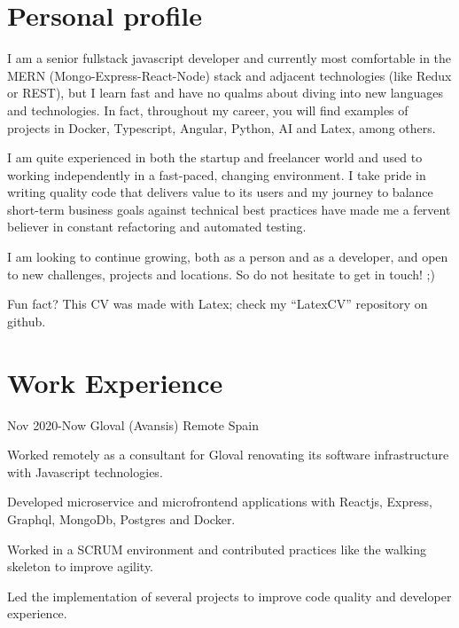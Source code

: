 \documentclass[10pt]{CurriculumVitae}
\begin{document}
  \makeheading

  \section{Personal profile}
    {
      I am a senior fullstack javascript developer and currently most comfortable in the MERN (Mongo-Express-React-Node) stack and adjacent technologies (like Redux or REST), but I learn fast and have no qualms about diving into new languages and technologies. In fact, throughout my career, you will find examples of projects in Docker, Typescript, Angular, Python, AI and Latex, among others.
      
      I am quite experienced in both the startup and freelancer world and used to working independently in a fast-paced, changing environment. I take pride in writing quality code that delivers value to its users and my journey to balance short-term business goals against technical best practices have made me a fervent believer in constant refactoring and automated testing.

      I am looking to continue growing, both as a person and as a developer, and open to new challenges, projects and locations. So do not hesitate to get in touch! ;) 
      
      \null\hfill {\scriptsize Fun fact? This CV was made with Latex; check my ``LatexCV'' repository on github.}
    }


  \section{Work Experience}

      {Nov 2020-Now}
      {Gloval (Avansis)}
      {Remote}
      {Spain}
      {
        \item Worked remotely as a consultant for Gloval renovating its software infrastructure with Javascript technologies.
        \item Developed microservice and microfrontend applications with Reactjs, Express, Graphql, MongoDb, Postgres and Docker.
        \item Worked in a SCRUM environment and contributed practices like the walking skeleton to improve agility.
        \item Led the implementation of several projects to improve code quality and developer experience. %
      }
 
\end{document}

